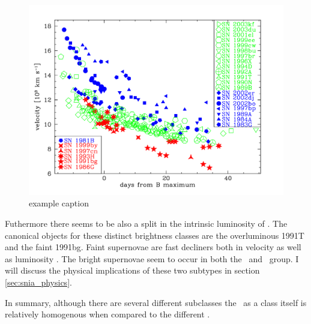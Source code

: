 \begin{figure}[htbp] %
   \centering
   \includegraphics[width=\textwidth]{chapter_intro/plots/velocity_gradient.pdf} 
   \caption{example caption}
   \label{fig:sn_class_lvg_hvg}
\end{figure}

Futhermore there seems to be also a split in the intrinsic luminosity of \sneia. The canonical objects for these distinct brightness classes are the overluminous 1991T \citet{1992AJ....103.1632P} and the faint 1991bg.
Faint supernovae are fast decliners both in velocity as well as luminosity \citet{2005ApJ...623.1011B}. The bright supernovae seem to occur in both the \hvg\ and \lvg\ group. I will discuss the physical implications of these two subtypes in section \ref{sec:snia_physics}.

In summary, although there are several different subclasses the \snia\ as a class itself is relatively homogenous when compared to the different \sneii.

